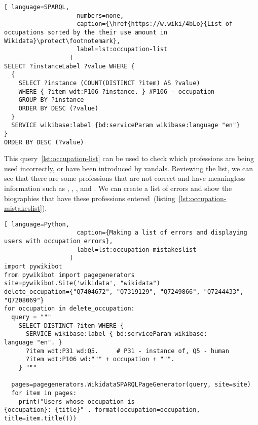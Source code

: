 \begin{lstlisting}[ language=SPARQL,
                    numbers=none,
                    caption={\href{https://w.wiki/4bLo}{List of occupations sorted by the their use amount in Wikidata}\protect\footnotemark},
                    label=lst:occupation-list
                  ]
SELECT ?instanceLabel ?value WHERE {
  {
    SELECT ?instance (COUNT(DISTINCT ?item) AS ?value) 
    WHERE { ?item wdt:P106 ?instance. } #P106 - occupation
    GROUP BY ?instance
    ORDER BY DESC (?value)
  }
  SERVICE wikibase:label {bd:serviceParam wikibase:language "en"}
}
ORDER BY DESC (?value)
\end{lstlisting} 

This query~\ref{lst:occupation-list} 
can be used to check which professions are being used incorrectly, or have been introduced by vandals.
Reviewing the list, we can see that there are some professions 
that are not correct and have meaningless information
such as , , ,  and . 
We can create a list of errors and show the biographies that have these professions entered~(listing~\ref{lst:occupation-mistakeslist}).

\begin{lstlisting}[ language=Python,
                    caption={Making a list of errors and displaying users with occupation errors},
                    label=lst:occupation-mistakeslist
                  ]
import pywikibot
from pywikibot import pagegenerators
site=pywikibot.Site('wikidata', "wikidata")
delete_occupation={"Q7404672", "Q7319129", "Q7249866", "Q7244433", 
"Q7208069"}
for occupation in delete_occupation:
  query = """
    SELECT DISTINCT ?item WHERE {
      SERVICE wikibase:label { bd:serviceParam wikibase:
language "en". }
      ?item wdt:P31 wd:Q5.     # P31 - instance of, Q5 - human
      ?item wdt:P106 wd:""" + occupation + """.
    } """

  pages=pagegenerators.WikidataSPARQLPageGenerator(query, site=site)
  for item in pages:
    print("Users whose occupation is
{occupation}: {title}" . format(occupation=occupation, 
title=item.title()))
\end{lstlisting} 

